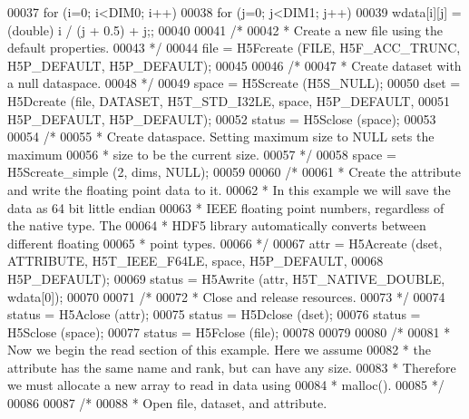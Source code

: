 \begin{DoxyCode}
00037     \textcolor{keywordflow}{for} (i=0; i<DIM0; i++)
00038         \textcolor{keywordflow}{for} (j=0; j<DIM1; j++)
00039             wdata[i][j] = (\textcolor{keywordtype}{double}) i / (j + 0.5) + j;;
00040 
00041     \textcolor{comment}{/*}
00042 \textcolor{comment}{     * Create a new file using the default properties.}
00043 \textcolor{comment}{     */}
00044     file = H5Fcreate (FILE, H5F\_ACC\_TRUNC, H5P\_DEFAULT, H5P\_DEFAULT);
00045 
00046     \textcolor{comment}{/*}
00047 \textcolor{comment}{     * Create dataset with a null dataspace.}
00048 \textcolor{comment}{     */}
00049     space = H5Screate (H5S\_NULL);
00050     dset = H5Dcreate (file, DATASET, H5T\_STD\_I32LE, space, H5P\_DEFAULT,
00051                 H5P\_DEFAULT, H5P\_DEFAULT);
00052     status = H5Sclose (space);
00053 
00054     \textcolor{comment}{/*}
00055 \textcolor{comment}{     * Create dataspace.  Setting maximum size to NULL sets the maximum}
00056 \textcolor{comment}{     * size to be the current size.}
00057 \textcolor{comment}{     */}
00058     space = H5Screate\_simple (2, dims, NULL);
00059 
00060     \textcolor{comment}{/*}
00061 \textcolor{comment}{     * Create the attribute and write the floating point data to it.}
00062 \textcolor{comment}{     * In this example we will save the data as 64 bit little endian}
00063 \textcolor{comment}{     * IEEE floating point numbers, regardless of the native type.  The}
00064 \textcolor{comment}{     * HDF5 library automatically converts between different floating}
00065 \textcolor{comment}{     * point types.}
00066 \textcolor{comment}{     */}
00067     attr = H5Acreate (dset, ATTRIBUTE, H5T\_IEEE\_F64LE, space, H5P\_DEFAULT,
00068                 H5P\_DEFAULT);
00069     status = H5Awrite (attr, H5T\_NATIVE\_DOUBLE, wdata[0]);
00070 
00071     \textcolor{comment}{/*}
00072 \textcolor{comment}{     * Close and release resources.}
00073 \textcolor{comment}{     */}
00074     status = H5Aclose (attr);
00075     status = H5Dclose (dset);
00076     status = H5Sclose (space);
00077     status = H5Fclose (file);
00078 
00079 
00080     \textcolor{comment}{/*}
00081 \textcolor{comment}{     * Now we begin the read section of this example.  Here we assume}
00082 \textcolor{comment}{     * the attribute has the same name and rank, but can have any size.}
00083 \textcolor{comment}{     * Therefore we must allocate a new array to read in data using}
00084 \textcolor{comment}{     * malloc().}
00085 \textcolor{comment}{     */}
00086 
00087     \textcolor{comment}{/*}
00088 \textcolor{comment}{     * Open file, dataset, and attribute.}

\end{DoxyCode}
